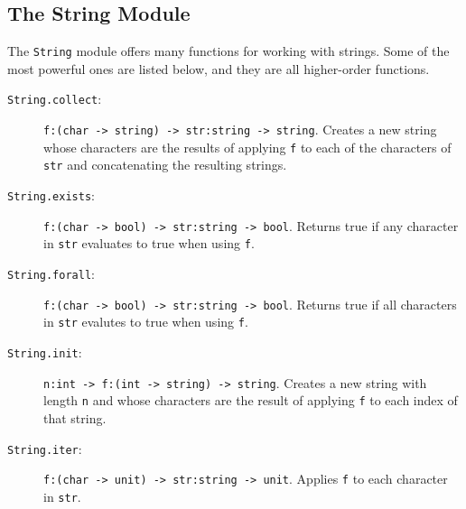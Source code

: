 \documentclass[fsharpnotes.tex]{subfiles}
\begin{document}
\subsection{The String Module}
The \lstinline{String} module offers many functions for working with strings. Some of the most powerful ones are listed below, and they are all higher-order functions.
\begin{description}
\item[\texttt{String.collect}:] \lstinline{f:(char -> string) -> str:string -> string}. Creates a new string whose characters are the results of applying \lstinline{f} to each of the characters of \lstinline{str} and concatenating the resulting strings.
 \item[\texttt{String.exists}:] \lstinline{f:(char -> bool) -> str:string -> bool}. Returns true if any character in \lstinline{str} evaluates to true when using \lstinline{f}.
 \item[\texttt{String.forall}:] \lstinline{f:(char -> bool) -> str:string -> bool}. Returns true if all characters in \lstinline{str} evalutes to true when using \lstinline{f}.
\item[\texttt{String.init}:] \lstinline{n:int -> f:(int -> string) -> string}. Creates a new string with length \lstinline{n} and whose characters are the result of applying \lstinline{f} to each index of that string.
\item[\texttt{String.iter}:] \lstinline{f:(char -> unit) -> str:string -> unit}. Applies \lstinline{f} to each character in \lstinline{str}.

\end{description}
\end{document}
